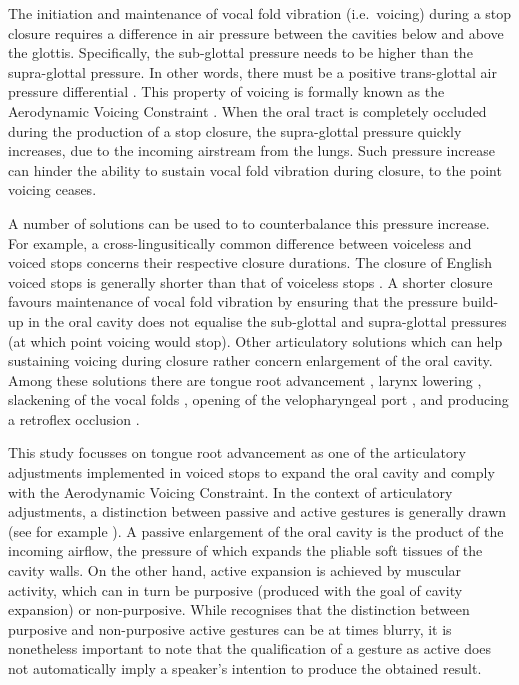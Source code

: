 \documentclass[preprint]{JASAnew}
\begin{document}
The initiation and maintenance of vocal fold vibration (i.e.~voicing)
during a stop closure requires a difference in air pressure between the
cavities below and above the glottis. Specifically, the sub-glottal
pressure needs to be higher than the supra-glottal pressure. In other
words, there must be a positive trans-glottal air pressure differential
\citep{berg1958, rothenberg1967}. This property of voicing is formally
known as the Aerodynamic Voicing Constraint \citep{ohala2011}. When the
oral tract is completely occluded during the production of a stop
closure, the supra-glottal pressure quickly increases, due to the
incoming airstream from the lungs. Such pressure increase can hinder the
ability to sustain vocal fold vibration during closure, to the point
voicing ceases.

A number of solutions can be used to to counterbalance this pressure
increase. For example, a cross-lingusitically common difference between
voiceless and voiced stops concerns their respective closure durations.
The closure of English voiced stops is generally shorter than that of
voiceless stops
\citep{lisker1957, umeda1977, van-summers1987, davis1989, de-jong1991}.
A shorter closure favours maintenance of vocal fold vibration by
ensuring that the pressure build-up in the oral cavity does not equalise
the sub-glottal and supra-glottal pressures (at which point voicing
would stop). Other articulatory solutions which can help sustaining
voicing during closure rather concern enlargement of the oral cavity.
Among these solutions there are tongue root advancement
\citep{kent1969, perkell1969, westbury1983, rothenberg1967, ahn2018},
larynx lowering \citep{riordan1980}, slackening of the vocal folds
\citet{halle1967}, opening of the velopharyngeal port
\citep{yanagihara1966}, and producing a retroflex occlusion
\citep{sprouse2008}.

This study focusses on tongue root advancement as one of the
articulatory adjustments implemented in voiced stops to expand the oral
cavity and comply with the Aerodynamic Voicing Constraint. In the
context of articulatory adjustments, a distinction between passive and
active gestures is generally drawn (see for example
\citealt{rothenberg1967}). A passive enlargement of the oral cavity is
the product of the incoming airflow, the pressure of which expands the
pliable soft tissues of the cavity walls. On the other hand, active
expansion is achieved by muscular activity, which can in turn be
purposive (produced with the goal of cavity expansion) or non-purposive.
While \citet{rothenberg1967} recognises that the distinction between
purposive and non-purposive active gestures can be at times blurry, it
is nonetheless important to note that the qualification of a gesture as
active does not automatically imply a speaker's intention to produce the
obtained result.
\end{document}
